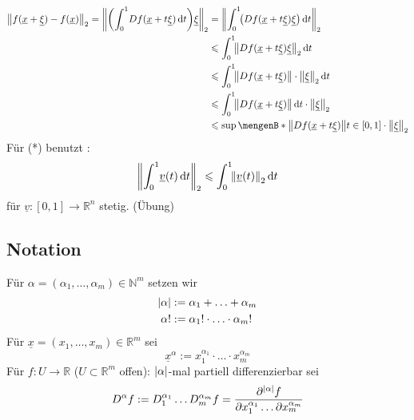 \begin{align*}
	\norm[2]{f(\underline{x} + \underline{\xi}) - f(\underline{x})} = \norm[2]{\enbrace*{\int_{0} ^{1} \!  D f( \underline{x} + t \underline{\xi})  \, \mathrm{d}t} \underline{\xi}} &= \norm[2]{\int_{0} ^{1} \! \enbrace*{D f( \underline{x} + t \underline{\xi}) \underline{\xi} } \, \mathrm{d}t}\\
	&\le \int_{0} ^{1} \! \norm[2]{D f(\underline{x} + t \underline{\xi}) \underline{\xi} }  \, \mathrm{d}t \\
	&\le \int_{0} ^{1} \!\norm{ D f (\underline{x}+ t \underline{\xi})} \cdot \norm[2]{\underline{\xi}}  \, \mathrm{d}t \\
	&\le \int_{0} ^{1} \! \norm{D f (\underline{x} + t \underline{\xi})}  \, \mathrm{d}t \cdot  \norm[2]{\underline{\xi}} \\
	&\le \sup \set[{\norm{D f(\underline{x} + t \underline{\xi})}}]{t \in [0,1]} \cdot \norm[2]{\underline{\xi}}     
\end{align*}
Für (*) benutzt :
\[
	\norm[2]{\int_{0} ^{1} \!  \underline{v} (t)  \, \mathrm{d}t} \le \int_{0} ^{1} \! \norm[2]{\underline{v}(t)}  \, \mathrm{d}t  
\]
für $\underline{v} : [0,1] \to \mathds{R}^n$ stetig. (Übung) \bewende

\subsection[Notation für Multiindizes]{Notation} %
\label{sub:712}
Für $\alpha = (\alpha_1 , \ldots , \alpha_m) \in \mathds{N}^m$ setzen wir 
\begin{align*}
	\abs*{\alpha} &:= \alpha_1 + \ldots + \alpha_m \\ 
	\alpha ! &:= \alpha_1 ! \cdot \ldots \cdot \alpha_m ! \\
\end{align*}
Für $\underline{x} = (x_1, \ldots , x_m) \in \mathds{R}^m$ sei
\[
	\underline{x}^\alpha := x_1^{\alpha_1} \cdot \ldots \cdot x_m^{\alpha_m}
\]
Für $f : U \to 	\mathds{R}$ ($U \subset \mathds{R}^m$ offen): $\abs*{\alpha}$-mal partiell differenzierbar sei
\[
	D^\alpha f := D_1^{\alpha_1} \ldots D_m^{\alpha_m} f = \frac{\partial^{\abs*{\alpha} }f}{\partial x_1^{\alpha_1} \ldots \partial x_m^{\alpha_m}} 
\]

